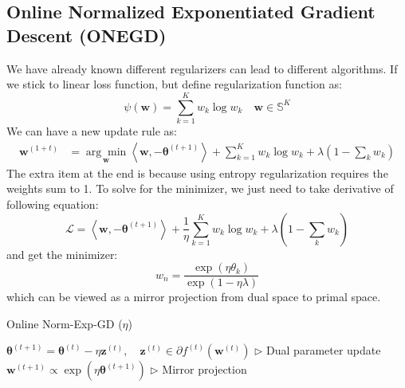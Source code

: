 \documentclass[11pt]{article}
\begin{document}
\subsection{Online Normalized Exponentiated Gradient Descent (ONEGD)}
We have already known different regularizers can lead to different algorithms. If we stick to linear loss function, but define regularization function as: 
\begin{equation}
\psi(\boldsymbol{w})=\sum_{k=1}^{K} w_{k} \log w_{k} \quad \boldsymbol{w} \in \mathbb{S}^{K}
\end{equation}
We can have a new update rule as:
\begin{equation}
\begin{aligned}
\boldsymbol{w}^{(1+t)} 
&=\underset{\boldsymbol{w}}{\arg \min }\left\langle\boldsymbol{w},-\boldsymbol{\theta}^{(t+1)}\right\rangle+\sum_{k=1}^{K} w_{k} \log w_{k}+\lambda\left(1-\sum_{k} w_{k}\right)
\end{aligned}
\end{equation}
The extra item at the end is because using entropy regularization requires the weights sum to 1.
To solve for the minimizer, we just need to take derivative of following equation:
\begin{equation}
\mathcal{L}=\left\langle\boldsymbol{w},-\boldsymbol{\theta}^{(t+1)}\right\rangle+\frac{1}{\eta} \sum_{k=1}^{K} w_{k} \log w_{k}+\lambda\left(1-\sum_{k} w_{k}\right)
\end{equation}
and get the minimizer:
\begin{equation}
w_{n}=\frac{\exp \left(\eta \theta_{k}\right)}{\exp (1-\eta \lambda)}
\end{equation}
which can be viewed as a mirror projection from dual space to primal space.
\begin{algorithm}[H]
\caption{ Online Norm-Exp-GD ($\eta$)}
\label{algo:onegd}
\begin{algorithmic}[1]
\STATE $\boldsymbol{\theta}^{(t+1)}=\boldsymbol{\theta}^{(t)}-\eta \boldsymbol{z}^{(t)}, \quad \boldsymbol{z}^{(t)} \in \partial f^{(t)}\left(\boldsymbol{w}^{(t)}\right)$ \hfill $\triangleright$ Dual parameter update
\STATE $\boldsymbol{w}^{(t+1)} \propto \exp \left(\eta \boldsymbol{\theta}^{(t+1)}\right)$ \hfill $\triangleright$ Mirror projection
\ENDFOR
\end{algorithmic}
\end{algorithm}
\end{document}
